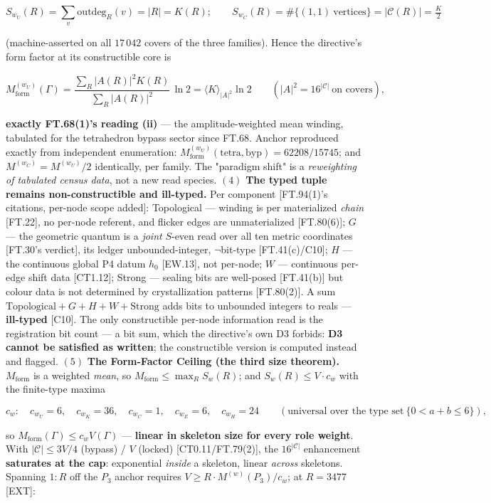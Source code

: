 \begin{theorem}
\[
S_{w_U}(R)=\sum_v \mathrm{outdeg}_R(v)=|R|=K(R);\qquad S_{w_C}(R)=\#\{(1,1)\ \text{vertices}\}=|\mathcal C(R)|=\tfrac{K}{2}
\]

(machine-asserted on all $17\,042$ covers of the three families). Hence the directive's form factor at its constructible core is

\[
M_{\mathrm{form}}^{(w_U)}(\Gamma)=\frac{\sum_R|A(R)|^2K(R)}{\sum_R|A(R)|^2}\,\ln2=\langle K\rangle_{|A|^2}\ln2\qquad(|A|^2=16^{|\mathcal C|}\ \text{on covers}),
\]

\textbf{exactly FT.68(1)'s reading (ii)} — the amplitude-weighted mean winding, tabulated for the tetrahedron bypass sector since FT.68. Anchor reproduced exactly from independent enumeration: $M_{\mathrm{form}}^{(w_U)}(\mathrm{tetra},\mathrm{byp})=62208/15745$; and $M^{(w_C)}=M^{(w_U)}/2$ identically, per family. The "paradigm shift" is a \textit{reweighting of tabulated census data}, not a new read species. $(4)$ \textbf{The typed tuple remains non-constructible and ill-typed.} Per component [FT.94(1)'s citations, per-node scope added]: Topological — winding is per materialized \textit{chain} [FT.22], no per-node referent, and flicker edges are unmaterialized [FT.80(6)]; $G$ — the geometric quantum is a \textit{joint} $S$-even read over all ten metric coordinates [FT.30's verdict], its ledger unbounded-integer, $\neg$bit-type [FT.41(c)/C10]; $H$ — the continuous global P4 datum $h_0$ [EW.13], not per-node; $W$ — continuous per-edge shift data [CT1.12]; Strong — sealing bits are well-posed [FT.41(b)] but colour data is not determined by crystallization patterns [FT.80(2)]. A sum $\mathrm{Topological}+G+H+W+\mathrm{Strong}$ adds bits to unbounded integers to reals — \textbf{ill-typed} [C10]. The only constructible per-node information read is the registration bit count — a bit sum, which the directive's own D3 forbids: \textbf{D3 cannot be satisfied as written}; the constructible version is computed instead and flagged. $(5)$ \textbf{The Form-Factor Ceiling (the third size theorem).} $M_{\mathrm{form}}$ is a weighted \textit{mean}, so $M_{\mathrm{form}}\le\max_R S_w(R)$; and $S_w(R)\le V\cdot c_w$ with the finite-type maxima

\[
c_w:\quad c_{w_U}=6,\quad c_{w_K}=36,\quad c_{w_C}=1,\quad c_{w_E}=6,\quad c_{w_H}=24\qquad(\text{universal over the type set}\ \{0<a+b\le6\}),
\]

so $M_{\mathrm{form}}(\Gamma)\le c_wV(\Gamma)$ — \textbf{linear in skeleton size for every role weight}. With $|\mathcal C|\le3V/4$ (bypass) / $V$ (locked) [CT0.11/FT.79(2)], the $16^{|\mathcal C|}$ enhancement \textbf{saturates at the cap}: exponential \textit{inside} a skeleton, linear \textit{across} skeletons. Spanning $1{:}R$ off the $P_3$ anchor requires $V\ge R\cdot M^{(w)}(P_3)/c_w$; at $R=3477$ [EXT]:


\end{theorem}

